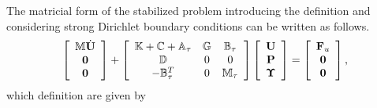 The matricial form of the stabilized problem  introducing the definition  and considering strong Dirichlet boundary conditions can be written as follows. 
\begin{equation}
\label{eq-C7_NSmatform}
\left[\begin{array}{c}
\mathbb{M}\dot{{\bf U}}\\
\mathbf{0}\\
\mathbf{0}
\end{array}\right]+\left[\begin{array}{ccc}
\mathbb{K}+\mathbb{C}+\mathbb{A}_\tau&\mathbb{G}&\mathbb{B}_\tau\\
\mathbb{D}&0&0\\
-\mathbb{B}_\tau^T&0&\mathbb{M}_\tau
\end{array}\right]\left[\begin{array}{c}
{\bf U}\\
{\bf P}\\
\boldsymbol{\Upsilon}
\end{array}\right]=\left[\begin{array}{c}
{\bf F}_u\\
\mathbf{0}\\
\mathbf{0}
\end{array}\right],
\end{equation}
which definition are given by
